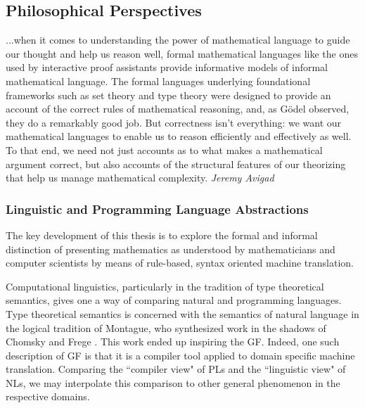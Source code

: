 \subsection{Philosophical Perspectives}

\begin{displayquote}

...when it comes to understanding the power of mathematical language to guide our
thought and help us reason well, formal mathematical languages like the ones
used by interactive proof assistants provide informative models of informal
mathematical language. The formal languages underlying foundational frameworks
such as set theory and type theory were designed to provide an account of the
correct rules of mathematical reasoning, and, as Gödel observed, they do a
remarkably good job. But correctness isn’t everything: we want our mathematical
languages to enable us to reason efficiently and effectively as well. To that
end, we need not just accounts as to what makes a mathematical argument correct,
but also accounts of the structural features of our theorizing that help us
manage mathematical complexity. \emph{Jeremy Avigad} \cite{avigad2015mathematics}

\end{displayquote}

\subsubsection{Linguistic and Programming Language Abstractions}

The key development of this thesis is to explore the formal and informal
distinction of presenting mathematics as understood by mathematicians and computer
scientists by means of rule-based, syntax oriented machine translation.

Computational linguistics, particularly in the tradition of type
theoretical semantics\cite{ranta1994type}, gives one a way of comparing natural
and programming languages. Type theoretical semantics is concerned with the
semantics of natural language in the logical tradition of Montague, who
synthesized work in the shadows of Chomsky \cite{Chomsky57} and Frege
\cite{frege79}. This work ended up inspiring the GF. Indeed, one such description
of GF is that it is a compiler tool applied to domain specific machine
translation. Comparing the ``compiler view" of PLs and the ``linguistic view"
of NLs, we may interpolate this comparison to other general phenomenon in the
respective domains.

